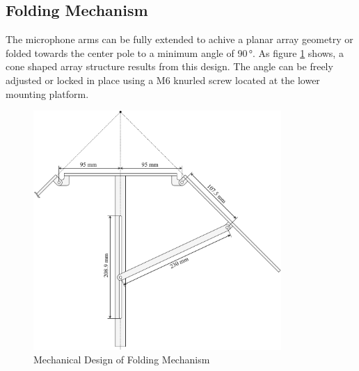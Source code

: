 \subsection{Folding Mechanism}
The microphone arms can be fully extended to achive a planar array geometry or folded towards the center pole to a minimum angle of 90\,°.
As figure \ref{fig:microphone_arm_folding_mechanism} shows, a cone shaped array structure results from this design.
The angle can be freely adjusted or locked in place using a M6 knurled screw located at the lower mounting platform.
\begin{figure}[h!]
	\centering
	\vspace{-0.1cm}
	\includegraphics[width=0.84\textwidth]{images/6_design_final/microphone_arm_folding_mechanism.pdf}
	\hspace{-3.6cm}
	\caption{Mechanical Design of Folding Mechanism}
	\label{fig:microphone_arm_folding_mechanism}
\end{figure}

